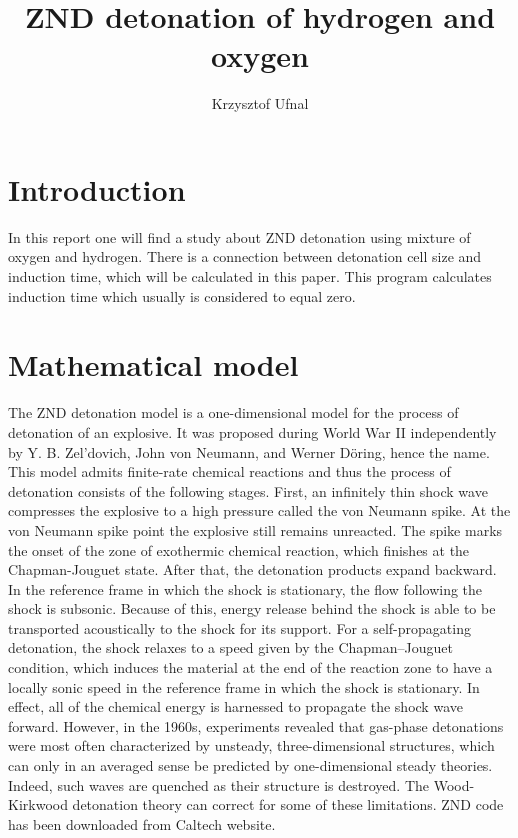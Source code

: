 \documentclass[a4paper]{article}
\title{ZND detonation of hydrogen and oxygen}
\author{Krzysztof Ufnal}
\begin{document}
\maketitle


\section{Introduction}\label{sec:intro}
In this report one will find a study about ZND detonation using mixture of oxygen and hydrogen. There is a connection between detonation cell size and induction time, which will be calculated in this paper. This program calculates induction time which usually is considered to equal zero.  
\section{Mathematical model}\label{sec:model}
The ZND detonation model is a one-dimensional model for the process of detonation of an explosive. 
It was proposed during World War II independently by Y. B. Zel'dovich, John von Neumann, and Werner Döring, hence the name. 
This model admits finite-rate chemical reactions and thus the process of detonation consists of the following stages. 
First, an infinitely thin shock wave compresses the explosive to a high pressure called the von Neumann spike. 
At the von Neumann spike point the explosive still remains unreacted. 
The spike marks the onset of the zone of exothermic chemical reaction, which finishes at the Chapman-Jouguet state. 
After that, the detonation products expand backward. 
In the reference frame in which the shock is stationary, the flow following the shock is subsonic. 
Because of this, energy release behind the shock is able to be transported acoustically to the shock for its support. 
For a self-propagating detonation, the shock relaxes to a speed given by the Chapman–Jouguet condition, which induces the material at the end of the reaction zone to have a locally sonic speed in the reference frame in which the shock is stationary. 
In effect, all of the chemical energy is harnessed to propagate the shock wave forward.
However, in the 1960s, experiments revealed that gas-phase detonations were most often characterized by unsteady, three-dimensional structures, which can only in an averaged sense be predicted by one-dimensional steady theories. 
Indeed, such waves are quenched as their structure is destroyed. The Wood-Kirkwood detonation theory can correct for some of these limitations.
ZND code has been downloaded from Caltech website. 
\end{document}

